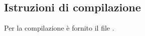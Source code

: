 \subsection{Istruzioni di compilazione} %
\label{sub:istruzioni_di_compilazione}
Per la compilazione è fornito il file .

